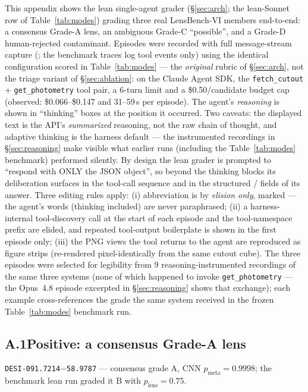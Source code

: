 \documentclass[11pt,letterpaper]{article}
\newcommand{\plens}{\ensuremath{p_{\mathrm{lens}}}}
\newcommand{\pmeta}{\ensuremath{p_{\mathrm{meta}}}}
\begin{document}
This appendix shows the lean single-agent grader (\S\ref{sec:arch}; the lean-Sonnet
row of Table~\ref{tab:modes}) grading three real LensBench-VI members end-to-end: a
consensus Grade-A lens, an ambiguous Grade-C ``possible'', and a Grade-D
human-rejected contaminant. Episodes were recorded with full message-stream
capture (; the benchmark traces log tool events
only) using the identical configuration scored in Table~\ref{tab:modes} --- the
\emph{original} rubric of \S\ref{sec:arch}, not the triage variant of
\S\ref{sec:ablation}:  on the Claude Agent SDK, the
\texttt{fetch\_cutout} +
\texttt{get\_photometry} tool pair, a 6-turn limit and a \$0.50/candidate budget cap
(observed: \$0.066--\$0.147 and 31--59\,s per episode). The agent's
\emph{reasoning} is shown in ``thinking'' boxes at the position it occurred. Two
caveats: the displayed text is the API's \emph{summarized} reasoning, not the raw
chain of thought, and adaptive thinking is the harness default --- the instrumented
recordings in \S\ref{sec:reasoning} make visible what earlier runs (including the
Table~\ref{tab:modes} benchmark) performed silently. By design the lean grader is
prompted to ``respond with ONLY the JSON object'', so beyond the thinking blocks its
deliberation surfaces in the tool-call sequence and in the structured
/ fields of its answer. Three editing rules apply: (i)
abbreviation is by \emph{elision only}, marked \code{[...]} --- the agent's words
(thinking included) are never paraphrased; (ii) a harness-internal tool-discovery
call at the start of each episode and the  tool-namespace
prefix are elided, and repeated tool-output boilerplate is shown in the first
episode only; (iii) the PNG views the tool returns to the agent are reproduced as
figure strips (re-rendered pixel-identically from the same cutout cube). The three
episodes were selected for legibility from 9 reasoning-instrumented recordings of
the same three systems (none of which happened to invoke
\texttt{get\_photometry} --- the Opus~4.8 episode excerpted in
\S\ref{sec:reasoning} shows that exchange); each example cross-references the grade
the same system received in the frozen Table~\ref{tab:modes} benchmark run.

\subsection*{A.1\quad Positive: a consensus Grade-A lens}
\texttt{DESI-091.7214$-$58.9787} --- consensus grade A, CNN $\pmeta=0.9998$; the
benchmark lean run graded it B with $\plens=0.75$.
\end{document}
